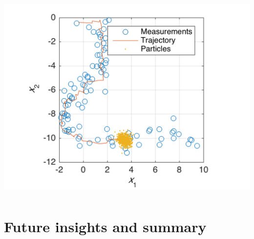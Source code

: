 \documentclass[xcolor=svgnames,english,handout]{beamer}
\begin{document}
\begin{frame}
\begin{columns}
\begin{column}{0.35\textwidth}
  \includegraphics[width=\columnwidth]{pf_est}
  \end{column}
  \end{columns}
\end{frame}


\section{Future insights and summary}
\end{document}
